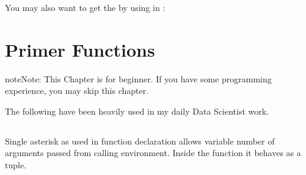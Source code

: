 \documentclass[letterpaper,12pt,english]{sphinxmanual}
\begin{document}
You may also want to get the  by using  in :

%
\begin{sphinxVerbatim}[commandchars=\\\{\}]
      \PYG{p}{[}\PYG{p}{]}
 
      \PYG{p}{[}\PYG{p}{]}
 
      \PYG{p}{[}\PYG{p}{]}
   
\end{sphinxVerbatim}


\chapter{Primer Functions}
\label{\detokenize{primer:primer-functions}}\label{\detokenize{primer:primer}}\label{\detokenize{primer::doc}}
\begin{sphinxadmonition}{note}{Note:}
This Chapter {\hyperref[\detokenize{primer:primer}]{}} is for beginner.  If you have some  programming experience, you may skip this chapter.
\end{sphinxadmonition}

The following  have been heavily used in my daily Data Scientist work.


\section{\sphinxstyleliteralintitle{\sphinxupquote{*}}}
\label{\detokenize{primer:id1}}
Single asterisk as used in function declaration allows variable number of arguments passed from calling environment. Inside the function it behaves as a tuple.
\end{document}
